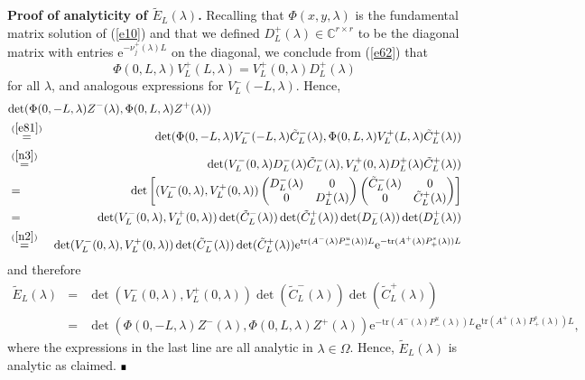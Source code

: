 \documentclass[10pt]{article}
\newenvironment{Proof}[1][.]%
 {\begin{trivlist}\item[]\textbf{Proof#1 }}%
 {\hspace*{\fill}$\rule{0.3\baselineskip}{0.35\baselineskip}$\end{trivlist}}
\numberwithin{equation}{section}
\newcommand{\C}{\mathbb{C}}
\newcommand{\rme}{\mathrm{e}}
\begin{document}
\begin{Proof}[ of analyticity of $\tilde{E}_L(\lambda)$.]
Recalling that $\Phi(x,y,\lambda)$ is the fundamental matrix solution of (\ref{e10}) and that we defined $D^+_L(\lambda)\in\C^{r\times r}$ to be the diagonal matrix with entries $\rme^{-\nu^+_j(\lambda)L}$ on the diagonal, we conclude from (\ref{e62}) that
\begin{equation}\label{n3}
\Phi(0,L,\lambda) V^+_L(L,\lambda) = V^+_L(0,\lambda) D^+_L(\lambda)
\end{equation}
for all $\lambda$, and analogous expressions for $V^-_L(-L,\lambda)$. Hence, 
\begin{eqnarray*}
\lefteqn{\det(\Phi(0,-L,\lambda)Z^-(\lambda),\Phi(0,L,\lambda)Z^+(\lambda)) } \\ & \stackrel{(\ref{e81})}{=} &
\det(\Phi(0,-L,\lambda)V^-_L(-L,\lambda)\tilde{C}^-_L(\lambda),\Phi(0,L,\lambda)V^+_L(L,\lambda)\tilde{C}^+_L(\lambda)) \\ & \stackrel{(\ref{n3})}{=} &
\det(V^-_L(0,\lambda)D^-_L(\lambda)\tilde{C}^-_L(\lambda),V^+_L(0,\lambda)D^+_L(\lambda)\tilde{C}^+_L(\lambda)) \\ &= &
\det\left[ (V^-_L(0,\lambda),V^+_L(0,\lambda)) \begin{pmatrix} D^-_L(\lambda) & 0 \\ 0 & D^+_L(\lambda) \end{pmatrix} \begin{pmatrix} \tilde{C}^-_L(\lambda) & 0 \\ 0 & \tilde{C}^+_L(\lambda) \end{pmatrix}\right] \\ & = &
\det(V^-_L(0,\lambda),V^+_L(0,\lambda)) \det(\tilde{C}^-_L(\lambda)) \det(\tilde{C}^+_L(\lambda))
\det(D^-_L(\lambda)) \det(D^+_L(\lambda)) \\ & \stackrel{(\ref{n2})}{=} &
\det(V^-_L(0,\lambda),V^+_L(0,\lambda)) \det(\tilde{C}^-_L(\lambda)) \det(\tilde{C}^+_L(\lambda))
\rme^{\mathrm{tr}(A^-(\lambda)P^u_-(\lambda))L} \rme^{-\mathrm{tr}(A^+(\lambda)P^s_+(\lambda))L}
\end{eqnarray*}
and therefore
\begin{eqnarray*}
\tilde{E}_L(\lambda) & = & \det(V^-_L(0,\lambda),V^+_L(0,\lambda)) \det(\tilde{C}^-_L(\lambda)) \det(\tilde{C}^+_L(\lambda)) \\ & = &
\det(\Phi(0,-L,\lambda)Z^-(\lambda),\Phi(0,L,\lambda)Z^+(\lambda))
\rme^{-\mathrm{tr}(A^-(\lambda)P^u_-(\lambda))L} \rme^{\mathrm{tr}(A^+(\lambda)P^s_+(\lambda))L},
\end{eqnarray*}
where the expressions in the last line are all analytic in $\lambda\in\Omega$. Hence, $\tilde{E}_L(\lambda)$ is analytic as claimed.
\end{Proof}
\end{document}
